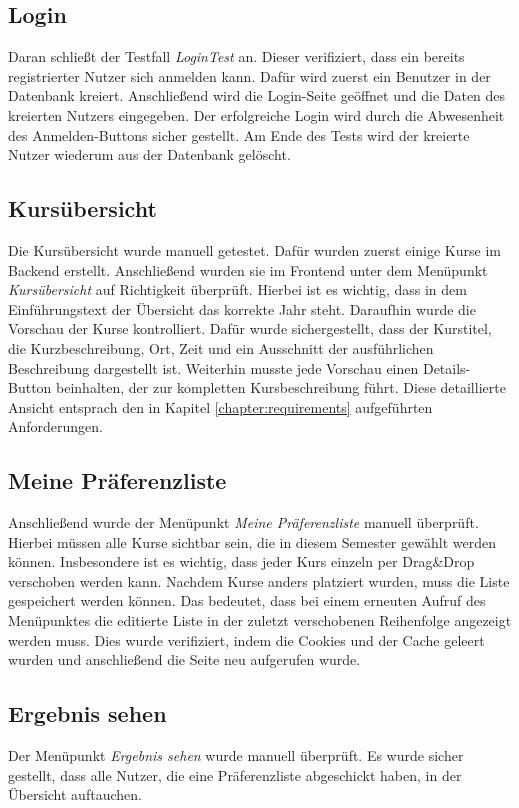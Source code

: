 		\subsection{Login}
			Daran schließt der Testfall \textit{LoginTest} an.
			Dieser verifiziert, dass ein bereits registrierter Nutzer sich anmelden kann.
			Dafür wird zuerst ein Benutzer in der Datenbank kreiert.
			Anschließend wird die Login-Seite geöffnet und die Daten des kreierten Nutzers eingegeben.
			Der erfolgreiche Login wird durch die Abwesenheit des \glqq Anmelden\grqq -Buttons sicher gestellt.
			Am Ende des Tests wird der kreierte Nutzer wiederum aus der Datenbank gelöscht.
		
		\subsection{Kursübersicht}
			Die Kursübersicht wurde manuell getestet.
			Dafür wurden zuerst einige Kurse im Backend erstellt.
			Anschließend wurden sie im Frontend unter dem Menüpunkt \textit{Kursübersicht} auf Richtigkeit überprüft.
			Hierbei ist es wichtig, dass in dem Einführungstext der Übersicht das korrekte Jahr steht.
			Daraufhin wurde die Vorschau der Kurse kontrolliert.
			Dafür wurde sichergestellt, dass der Kurstitel, die Kurzbeschreibung, Ort, Zeit und ein Ausschnitt der ausführlichen Beschreibung dargestellt ist.
			Weiterhin musste jede Vorschau einen \glqq Details\grqq -Button beinhalten, der zur kompletten Kursbeschreibung führt.
			Diese detaillierte Ansicht entsprach den in Kapitel \ref{chapter:requirements} aufgeführten Anforderungen.
		
		\subsection{Meine Präferenzliste}
			Anschließend wurde der Menüpunkt \textit{Meine Präferenzliste} manuell überprüft.
			Hierbei müssen alle Kurse sichtbar sein, die in diesem Semester gewählt werden können.
			Insbesondere ist es wichtig, dass jeder Kurs einzeln per Drag\&Drop verschoben werden kann.
			Nachdem Kurse anders platziert wurden, muss die Liste gespeichert werden können.
            Das bedeutet, dass bei einem erneuten Aufruf des Menüpunktes die editierte Liste in der zuletzt verschobenen Reihenfolge angezeigt werden muss.
			Dies wurde verifiziert, indem die Cookies und der Cache geleert wurden und anschließend die Seite neu aufgerufen wurde.
		
		\subsection{Ergebnis sehen}
			Der Menüpunkt \textit{Ergebnis sehen} wurde manuell überprüft.
			Es wurde sicher gestellt, dass alle Nutzer, die eine Präferenzliste abgeschickt haben, in der Übersicht auftauchen.
		
